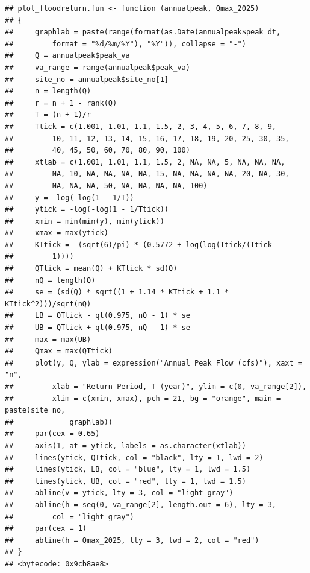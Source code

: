 \documentclass{tufte-handout}\usepackage[]{graphicx}\usepackage[]{xcolor}
\makeatletter
\newenvironment{kframe}{%
 \def\at@end@of@kframe{}%
 \ifinner\ifhmode%
  \def\at@end@of@kframe{\end{minipage}}%
  \begin{minipage}{\columnwidth}%
 \fi\fi%
 \def\FrameCommand##1{\hskip\@totalleftmargin \hskip-\fboxsep
 \colorbox{shadecolor}{##1}\hskip-\fboxsep
     \hskip-\linewidth \hskip-\@totalleftmargin \hskip\columnwidth}%
 \MakeFramed {\advance\hsize-\width
   \@totalleftmargin\z@ \linewidth\hsize
   \@setminipage}}%
 {\par\unskip\endMakeFramed%
 \at@end@of@kframe}
\newenvironment{knitrout}{}{} %
\makeatother
\begin{document}
\begin{knitrout}
\color{fgcolor}\begin{kframe}
\begin{verbatim}
## plot_floodreturn.fun <- function (annualpeak, Qmax_2025) 
## {
##     graphlab = paste(range(format(as.Date(annualpeak$peak_dt, 
##         format = "%d/%m/%Y"), "%Y")), collapse = "-")
##     Q = annualpeak$peak_va
##     va_range = range(annualpeak$peak_va)
##     site_no = annualpeak$site_no[1]
##     n = length(Q)
##     r = n + 1 - rank(Q)
##     T = (n + 1)/r
##     Ttick = c(1.001, 1.01, 1.1, 1.5, 2, 3, 4, 5, 6, 7, 8, 9, 
##         10, 11, 12, 13, 14, 15, 16, 17, 18, 19, 20, 25, 30, 35, 
##         40, 45, 50, 60, 70, 80, 90, 100)
##     xtlab = c(1.001, 1.01, 1.1, 1.5, 2, NA, NA, 5, NA, NA, NA, 
##         NA, 10, NA, NA, NA, NA, 15, NA, NA, NA, NA, 20, NA, 30, 
##         NA, NA, NA, 50, NA, NA, NA, NA, 100)
##     y = -log(-log(1 - 1/T))
##     ytick = -log(-log(1 - 1/Ttick))
##     xmin = min(min(y), min(ytick))
##     xmax = max(ytick)
##     KTtick = -(sqrt(6)/pi) * (0.5772 + log(log(Ttick/(Ttick - 
##         1))))
##     QTtick = mean(Q) + KTtick * sd(Q)
##     nQ = length(Q)
##     se = (sd(Q) * sqrt((1 + 1.14 * KTtick + 1.1 * KTtick^2)))/sqrt(nQ)
##     LB = QTtick - qt(0.975, nQ - 1) * se
##     UB = QTtick + qt(0.975, nQ - 1) * se
##     max = max(UB)
##     Qmax = max(QTtick)
##     plot(y, Q, ylab = expression("Annual Peak Flow (cfs)"), xaxt = "n", 
##         xlab = "Return Period, T (year)", ylim = c(0, va_range[2]), 
##         xlim = c(xmin, xmax), pch = 21, bg = "orange", main = paste(site_no, 
##             graphlab))
##     par(cex = 0.65)
##     axis(1, at = ytick, labels = as.character(xtlab))
##     lines(ytick, QTtick, col = "black", lty = 1, lwd = 2)
##     lines(ytick, LB, col = "blue", lty = 1, lwd = 1.5)
##     lines(ytick, UB, col = "red", lty = 1, lwd = 1.5)
##     abline(v = ytick, lty = 3, col = "light gray")
##     abline(h = seq(0, va_range[2], length.out = 6), lty = 3, 
##         col = "light gray")
##     par(cex = 1)
##     abline(h = Qmax_2025, lty = 3, lwd = 2, col = "red")
## }
## <bytecode: 0x9cb8ae8>
\end{verbatim}
\end{kframe}
\end{knitrout}
\end{document}
